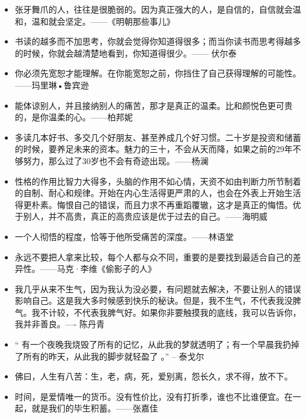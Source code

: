 \documentclass[UTF8,a4paper,8pt]{ctexbook}
\begin{document}
\begin{itemize}
		\item 张牙舞爪的人，往往是很脆弱的。因为真正强大的人，是自信的，自信就会温和，温和就会坚定。——《明朝那些事儿》
		
		\item 书读的越多而不加思考，你就会觉得你知道得很多；而当你读书而思考得越多的时候，你就会越清楚地看到，你知道得很少。—— 伏尔泰
		
		\item 你必须先宽恕才能理解。在你能宽恕之前，你挡住了自己获得理解的可能性。——玛里琳•鲁宾逊
		
		\item 能体谅别人，并且接纳别人的痛苦，那才是真正的温柔。比和颜悦色更可贵的，是你温柔的心。——柏邦妮
		
		\item 多读几本好书、多交几个好朋友、甚至养成几个好习惯。二十岁是投资和储蓄的时候，要养足未来的资本。魅力的三十，不会从天而降，如果之前的29年不够努力，那么过了30岁也不会有奇迹出现。——杨澜
		
		\item 性格的作用比智力大得多，头脑的作用不如心情，天资不如由判断力所节制着的自制、耐心和规律。开始在内心生活得更严肃的人，也会在外表上开始生活得更朴素。悔恨自己的错误，而且力求不再重蹈覆辙，这才是真正的悔悟。优于别人，并不高贵，真正的高贵应该是优于过去的自己。——海明威
		
		\item 一个人彻悟的程度，恰等于他所受痛苦的深度。——林语堂
		
		\item 永远不要把人拿来比较，每个人都与众不同，重要的是要找到最适合自己的差异性。——马克·李维《偷影子的人》
		
		\item 我几乎从来不生气，因为我认为没必要，有问题就去解决，不要让别人的错误影响自己。这是我大多时候感到快乐的秘诀。但是，我不生气，不代表我没脾气。我不计较，不代表我脾气好。如果你非要触摸我的底线，我可以告诉你，我并非善良。---- 陈丹青
		
		\item “ 有一个夜晚我烧毁了所有的记忆，从此我的梦就透明了；有一个早晨我扔掉了所有的昨天，从此我的脚步就轻盈了 。” -- 泰戈尔
		
		\item 佛曰，人生有八苦：生，老，病，死，爱别离，怨长久，求不得，放不下。
		
		\item 时间，是爱情唯一的货币。没有性价比，没有打折季，谁也不比谁便宜。在一起，就是我们的毕生积蓄。——张嘉佳
		

\end{itemize}
\end{document}

